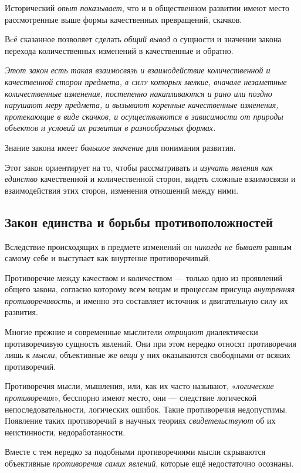 \documentclass[a4paper,14pt,russian]{extreport}
\begin{document}
Исторический \emph{опыт показывает}, что и в общественном развитии имеют место рассмотренные выше формы качественных превращений, скачков.

Вcё сказанное позволяет сделать \emph{общий вывод} о сущности и значении закона перехода количественных изменений в качественные и обратно.

\emph{Этот закон есть такая взаимосвязь и взаимодействие количественной и качественной сторон предмета, в \textsc{силу} которых мелкие, вначале незаметные количественные изменения, постепенно накапливаются и рано или поздно нарушают меру предмета, и вызывают коренные качественные изменения, протекающие в виде скачков, и осуществляются в зависимости от природы объект\textsc{ов и} условий их развития в разнообразных формах.}

Знание закона имеет \emph{большое значение} для понимания развития.

Этот закон ориентирует на то, чтобы рассматривать и \emph{изучать явления как единство} качественной и количественной сторон, видеть сложные взаимосвязи и взаимодействия этих сторон, изменения отношений между ними.

\subsection{Закон единства и борьбы противоположностей}

Вследствие происходящих в предмете изменений он \emph{никогда не бывает} равным самому себе и выступает как внуртенне противоречивый.

Противоречие между качеством и количеством --- только одно из проявлений общего закона, согласно которому всем вещам и процессам присуща \emph{внутренняя противоречивость}, и именно это составляет источник и двигательную силу их развития.

Многие прежние и современные мыслители \emph{отрицают} диалектически противоречивую сущность явлений. Они при этом нередко относят противоречия лишь к \emph{мысли}, объективные же \emph{вещи} у них оказываются свободными от всяких противоречий.

Противоречия мысли, мышления, или, как их часто называют, «\emph{логические противоречия}», бесспорно имеют место, они --- следствие логической непоследовательности, логических ошибок. Такие противоречия недопустимы. Появление таких противоречий в научных теориях \emph{свидетельствуют} об их неистинности, недоработанности.

Вместе с тем нередко за подобными противоречиями мысли скрываются объективные \emph{противоречия самих явлений}, которые ещё недостаточно осознаны.
\end{document}
